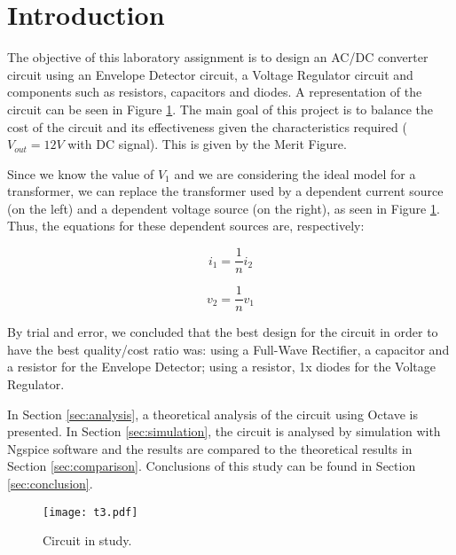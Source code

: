 \section{Introduction}
\label{sec:introduction}

The objective of this laboratory assignment is to design an AC/DC converter circuit using an Envelope Detector circuit, a Voltage Regulator circuit and components such as resistors, capacitors and diodes. A representation of the circuit can be seen in Figure \ref{fig:t3}. 
The main goal of this project is to balance the cost of the circuit and its effectiveness given the characteristics required ($V_{out}=12V$ with DC signal). This is given by the Merit Figure. \par
Since we know the value of $V_1$ and we are considering the ideal model for a transformer, we can replace the transformer used by a dependent current source (on the left) and a dependent voltage source (on the right), as seen in Figure \ref{fig:t3}. Thus, the equations for these dependent sources are, respectively:

\begin{equation}
  i_1=\frac{1}{n}i_2
  \label{eq:kvl1}
\end{equation} 

\begin{equation}
  v_2=\frac{1}{n}v_1
  \label{eq:kvl2}
\end{equation} 

By trial and error, we concluded that the best design for the circuit in order to have the best quality/cost ratio was:
\quad using a Full-Wave Rectifier, a capacitor and a resistor for the Envelope Detector;
\quad using a resistor, 1x diodes for the Voltage Regulator.

In Section \ref{sec:analysis}, a theoretical analysis of the circuit using Octave is
presented. In Section \ref{sec:simulation}, the circuit is analysed by
simulation with Ngspice software and the results are compared to the theoretical results in Section \ref{sec:comparison}. Conclusions of this study can be found in
Section \ref{sec:conclusion}.

\begin{figure}[htp] \centering
\texttt{[image: t3.pdf]}
\caption{Circuit in study.}
\label{fig:t3}
\end{figure}
\FloatBarrier

